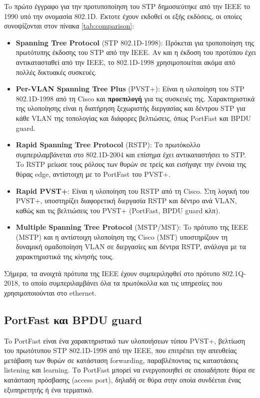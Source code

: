\documentclass[eforms]{EdipyLabs} %
\begin{document}
To πρώτο έγγραφο για την προτυποποίηση του STP δημοσιεύτηκε από την IEEE το 1990 υπό την ονομασία 802.1D. Έκτοτε έχουν εκδοθεί οι εξής εκδόσεις, οι οποίες συνοψίζονται στον πίνακα \ref{tab:comparison}: 
\begin{itemize}
	\item \textbf{Spanning Tree Protocol} (STP 802.1D-1998): Πρόκεται για τροποποίηση της πρωτότυπης έκδοσης του STP από την ΙΕΕΕ. Αν και η έκδοση του προτύπου έχει αντικατασταθεί από την IEEE, το 802.1D-1998 χρησιμοποιείται ακόμα από πολλές δικτυακές συσκευές. 
	\item \textbf{Per-VLAN Spanning Tree Plus} (PVST+): Είναι η υλοποίηση του STP 802.1D-1998 από τη Cisco και \textbf{προεπιλογή} για τις συσκευές της. Χαρακτηριστικά της υλοποίησης είναι η διατήρηση ξεχωριστής διεργασίας και δέντρου STP για κάθε VLAN της τοπολογίας και διάφορες βελτιώσεις, όπως PortFast και BPDU guard.
	\item \textbf{Rapid Spanning Tree Protocol} (RSTP): Το πρωτόκολλο συμπεριλαμβάνεται στο 802.1D-2004 και επίσημα έχει αντικαταστήσει το STP. To RSTP μείωσε τους ρόλους των θυρών σε τρείς και εισήγαγε την έννοια της θύρας edge, αντίστοιχη με το PortFast του PVST+.
	\item \textbf{Rapid PVST+}: Είναι η υλοποίηση του RSTP από τη Cisco. Στη λογική του PVST+, υποστηρίζει διαφορετική διεργασία RSTP και δέντρο ανά VLAN, καθώς και τις βελτιώσεις του PVST+ (PortFast, BPDU guard κλπ).
	\item \textbf{Multiple Spanning Tree Protocol} (MSTP/MST): To πρότυπο της IEEE (MSTP) και η αντίστοιχη υλοποίηση της Cisco (MST) υποστηρίζουν τη δυναμική ομαδοποίηση VLAN σε διεργασίες και δέντρα RSTP, ανάλογα με τα χαρακτηριστικά της κίνησής τους.

\end{itemize}

Σήμερα, τα ανοιχτά πρότυπα της IEEE έχουν συμπεριληφθεί στο πρότυπο 802.1Q-2018, το οποίο συμπεριλαμβάνει όλα τα πρωτόκολλα και τις υπηρεσίες που χρησιμοποιούνται στο ethernet.   

\subsection{PortFast και BPDU guard}
To PortFast είναι ένα χαρακτηριστικό των υλοποιήσεων τύπου PVST+, βελτίωση του πρωτότυπου STP 802.1D-1998 από την IEEE, που επιτρέπει την απευθείας μετάβαση των θυρών σε κατάσταση forwarding, παραβλέποντας τις καταστάσεις listening και learning. Το PortFast μπορεί να ενεργοποιηθεί σε οποιαδήποτε θύρα σε κατάσταση πρόσβασης (access port), δηλαδή σε θύρα στην οποία συνδέεται ένας εξυπηρετητής ή ένα τερματικό.
\end{document}
